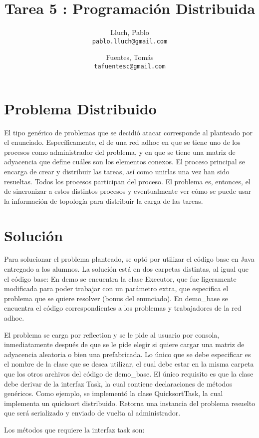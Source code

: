 \documentclass[12pt,spanish]{article}
\author{
  Lluch, Pablo\\
  \texttt{pablo.lluch@gmail.com}
  \and
  Fuentes, Tomás\\
  \texttt{tafuentesc@gmail.com}
}
\title{Tarea 5 : Programación Distribuida}
\begin{document}
	\maketitle
	\newpage

	\section{Problema Distribuido}

	El tipo genérico de problemas que se decidió atacar corresponde al planteado por el enunciado. Específicamente, el de una red adhoc en que se tiene uno de los procesos como administrador del problema, y en que se tiene una matriz de adyacencia que define cuáles son los elementos conexos. El proceso principal se encarga de crear y distribuir las tareas, así como unirlas una vez han sido resueltas. Todos los procesos participan del proceso. El problema es, entonces, el de sincronizar a estos distintos procesos y eventualmente ver cómo se puede usar la información de topología para distribuir la carga de las tareas.

	\section{Solución}

	Para solucionar el problema planteado, se optó por utilizar el código base en Java entregado a los alumnos. La solución está en dos carpetas distintas, al igual que el código base: En demo se encuentra la clase Executor, que fue ligeramente modificada para poder trabajar con un parámetro extra, que especifica el problema que se quiere resolver (bonus del enunciado). En demo\_base se encuentra el código correspondientes a los problemas y trabajadores de la red adhoc.

	El problema se carga por reflection y se le pide al usuario por consola, inmediatamente después de que se le pide elegir si quiere cargar una matriz de adyacencia aleatoria o bien una prefabricada. Lo único que se debe especificar es el nombre de la clase que se desea utilizar, el cual debe estar en la misma carpeta que los otros archivos del código de demo\_base. El único requisito es que la clase debe derivar de la interfaz Task, la cual contiene declaraciones de métodos genéricos. Como ejemplo, se implementó la clase QuicksortTask, la cual implementa un quicksort distribuido. Retorna una instancia del problema resuelto que será serializado y enviado de vuelta al administrador.

	Los métodos que requiere la interfaz task son:
\end{document}
